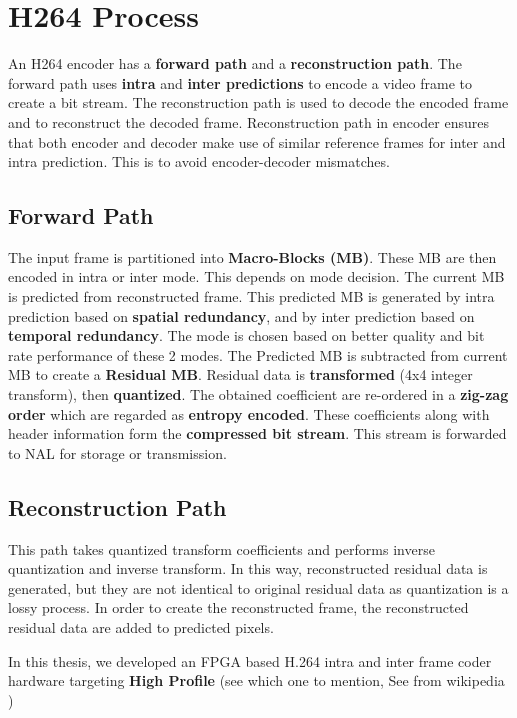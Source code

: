 \section{H264 Process}
An H264 encoder has a \textbf{forward path} and a \textbf{reconstruction path}. The forward path uses \textbf{intra} and \textbf{inter predictions} to encode a video frame to create a bit stream. The reconstruction path is used to decode the encoded frame and to reconstruct the decoded frame. Reconstruction path in encoder ensures that both encoder and decoder make use of similar reference frames for inter and intra prediction. This is to avoid encoder-decoder mismatches. 

\subsection{Forward Path}
The input frame is partitioned into \textbf{Macro-Blocks (MB)}. These MB are then encoded in intra or inter mode. This depends on mode decision. The current MB is predicted from reconstructed frame. This predicted MB is generated by intra prediction based on \textbf{spatial redundancy}, and by inter prediction based on \textbf{temporal redundancy}. The mode is chosen based on better quality and bit rate performance of these 2 modes. The Predicted MB is subtracted from current MB to create a \textbf{Residual MB}. Residual data is \textbf{transformed} (4x4 integer transform), then \textbf{quantized}. The obtained coefficient are re-ordered in a \textbf{zig-zag order} which are regarded as \textbf{entropy encoded}. These coefficients along with header information form the \textbf{compressed bit stream}. This stream is forwarded to NAL for storage or transmission. 

\subsection{Reconstruction Path}
This path takes quantized transform coefficients and performs inverse quantization and inverse transform. In this way, reconstructed residual data is generated, but they are not identical to original residual data as quantization is a lossy process. In order to create the reconstructed frame, the reconstructed residual data are added to predicted pixels. 

In this thesis, we developed an FPGA based H.264 intra and inter frame coder hardware targeting \textbf{High Profile} (see which one to mention, See from wikipedia )


